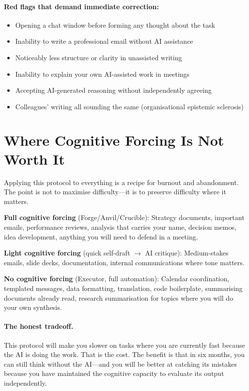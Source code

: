 \documentclass[11pt,a4paper]{article}
\begin{document}
\paragraph{Red flags that demand immediate correction:}
\begin{itemize}
    \item Opening a chat window before forming any thought about the task
    \item Inability to write a professional email without AI assistance
    \item Noticeably less structure or clarity in unassisted writing
    \item Inability to explain your own AI-assisted work in meetings
    \item Accepting AI-generated reasoning without independently agreeing
    \item Colleagues' writing all sounding the same (organisational epistemic
    sclerosis)
\end{itemize}

\section{Where Cognitive Forcing Is Not Worth It}
\label{sec:triage}

Applying this protocol to everything is a recipe for burnout and abandonment. The
point is not to maximise difficulty---it is to preserve difficulty where it
matters.

\textbf{Full cognitive forcing} (Forge/Anvil/Crucible): Strategy documents,
important emails, performance reviews, analysis that carries your name, decision
memos, idea development, anything you will need to defend in a meeting.

\textbf{Light cognitive forcing} (quick self-draft $\rightarrow$ AI critique):
Medium-stakes emails, slide decks, documentation, internal communications where
tone matters.

\textbf{No cognitive forcing} (Executor, full automation): Calendar coordination,
templated messages, data formatting, translation, code boilerplate, summarising
documents already read, research summarisation for topics where you will do your
own synthesis.

\paragraph{The honest tradeoff.} This protocol will make you slower on tasks
where you are currently fast because the AI is doing the work. That is the cost.
The benefit is that in six months, you can still think without the AI---and you
will be better at catching its mistakes because you have maintained the cognitive
capacity to evaluate its output independently.
\end{document}
